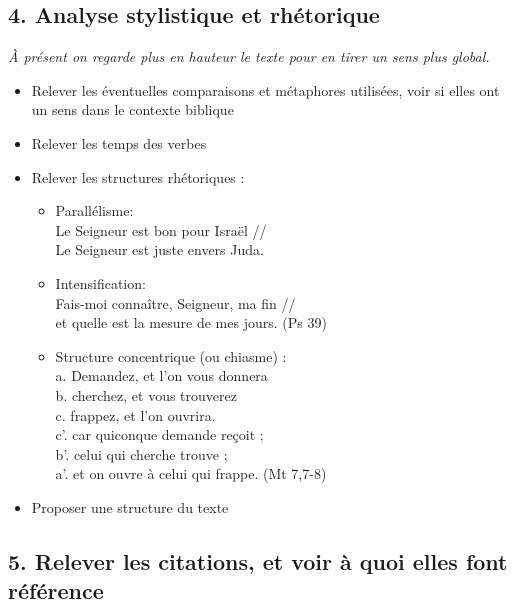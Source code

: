 \subsection*{4. Analyse stylistique et rhétorique}
\emph{À présent on regarde plus en hauteur le texte pour en tirer un sens plus global.}
\begin{itemize}[label=]
\item Relever les éventuelles comparaisons et métaphores utilisées, voir si elles ont un sens dans le contexte biblique
\item Relever les temps des verbes
\item Relever les structures rhétoriques :
\begin{itemize}[label=]
\item Parallélisme:\\
\decalage Le Seigneur est bon pour Israël // \\
\decalage Le Seigneur est juste envers Juda.
\item Intensification:\\
\decalage Fais-moi connaître, Seigneur, ma fin // \\
\decalage et quelle est la mesure de mes jours. (Ps 39)
\item Structure concentrique (ou chiasme) :\\
\decalage a. Demandez, et l’on vous donnera\\
\decalage \decalage b. cherchez, et vous trouverez\\
\decalage \decalage \decalage c. frappez, et l’on ouvrira.\\
\decalage \decalage \decalage c’. car quiconque demande reçoit ;\\
\decalage \decalage b’. celui qui cherche trouve ;\\
\decalage a’. et on ouvre à celui qui frappe. (Mt 7,7-8)
\end{itemize}
\item Proposer une structure du texte
\end{itemize}
\subsection*{5. Relever les citations, et voir à quoi elles font référence}
